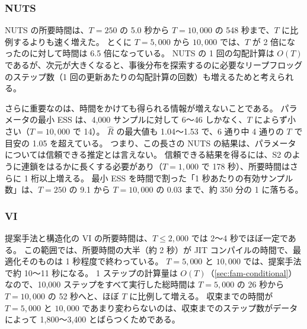\begin{table}[tbp]
  \centering
  \caption{系列長 $T$ と所要時間 [秒]（S3、標準シナリオ）。
    NUTS の時間は総時間、最小 ESS と最大 $\hat R$ はパラメータ $(\mu, \phi, \sigma)$ についての値。
    提案手法は ELBO が収束するまでの時間と、10,000 ステップをすべて実行した総時間の両方を示す。
    ほかの VI は収束するまでの時間。時間はいずれも JIT コンパイルを含む。}
  \label{tab:scaling}
  \small
  \setlength{\tabcolsep}{4pt}
  
\end{table}

\subsubsection{NUTS}

NUTS の所要時間は、$T = 250$ の 5.0 秒から $T = 10{,}000$ の 548 秒まで、$T$ に比例するよりも速く増えた。
とくに $T = 5{,}000$ から $10{,}000$ では、$T$ が 2 倍になったのに対して時間は 6.5 倍になっている。
NUTS の 1 回の勾配計算は $O(T)$ であるが、次元が大きくなると、事後分布を探索するのに必要なリープフロッグのステップ数（1 回の更新あたりの勾配計算の回数）も増えるためと考えられる。

さらに重要なのは、時間をかけても得られる情報が増えないことである。
パラメータの最小 ESS は、4,000 サンプルに対して 6〜46 しかなく、$T$ によらず小さい（$T = 10{,}000$ で 14）。
$\hat R$ の最大値も 1.04〜1.53 で、6 通り中 4 通りの $T$ で目安の 1.05 を超えている。
つまり、この長さの NUTS の結果は、パラメータについては信頼できる推定とは言えない。
信頼できる結果を得るには、S2 のように連鎖をはるかに長くする必要があり（$T = 1{,}000$ で 178 秒）、所要時間はさらに 1 桁以上増える。
最小 ESS を時間で割った「1 秒あたりの有効サンプル数」は、$T = 250$ の 9.1 から $T = 10{,}000$ の 0.03 まで、約 350 分の 1 に落ちる。

\subsubsection{VI}

提案手法と構造化の VI の所要時間は、$T \le 2{,}000$ では 2〜4 秒でほぼ一定である。
この範囲では、所要時間の大半（約 2 秒）が JIT コンパイルの時間で、最適化そのものは 1 秒程度で終わっている。
$T = 5{,}000$ と $10{,}000$ では、提案手法で約 10〜11 秒になる。
1 ステップの計算量は $O(T)$（\cref{sec:fam-conditional}）なので、10,000 ステップをすべて実行した総時間は $T = 5{,}000$ の 26 秒から $T = 10{,}000$ の 52 秒へと、ほぼ $T$ に比例して増える。
収束までの時間が $T = 5{,}000$ と $10{,}000$ であまり変わらないのは、収束までのステップ数がデータによって 1,800〜3,400 とばらつくためである。

